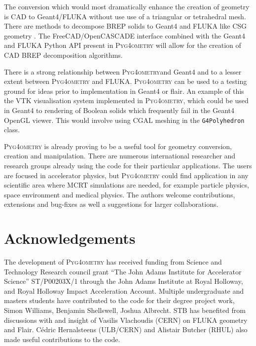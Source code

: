 \documentclass[final,5p,times,twocolumn]{elsarticle}
\newcommand{\pyinline}[1]{\lstinline[postbreak={}]{#1}}
\newcommand{\PYGEOMETRY}{\textsc{Pyg4ometry}}
\begin{document}
The conversion which would most dramatically enhance the creation of geometry is CAD to Geant4/FLUKA
without use use of a triangular or tetrahedral mesh. There are methods to decompose BREP solids to Geant4 and 
FLUKA like CSG geometry \cite{WangNuclSciTech31-82-2020, LuFusionEngineeringAndDesign124-2017}. 
The FreeCAD/OpenCASCADE interface combined with the Geant4 and FLUKA Python API present in \PYGEOMETRY{} 
will allow for the creation of CAD BREP decomposition algorithms.

There is a strong relationship between \PYGEOMETRY and Geant4 and to a lesser extent between 
\PYGEOMETRY{} and FLUKA. \PYGEOMETRY{} can be used to a testing ground for ideas prior to 
implementation in Geant4 or flair. An example of this the VTK visualisation system implemented in 
\PYGEOMETRY{}, which could be used in Geant4 to rendering of Boolean solids which frequently 
fail in the Geant4 OpenGL viewer. This would involve using CGAL meshing in the \pyinline{G4Polyhedron}
class. %

\PYGEOMETRY{} is already proving to be a useful tool for geometry conversion, creation and manipulation.
There are numerous international researcher and research groups already using the code for their particular applications.
The users are focused in accelerator physics, but \PYGEOMETRY{} could find application in any scientific
area where MCRT simulations are needed, for example particle physics, space environment and medical physics.
The authors welcome contributions, extensions and bug-fixes as well a suggestions for larger collaborations.

\section{Acknowledgements}

The development of \PYGEOMETRY{} has received funding from Science and
Technology Research council grant ``The John Adams Institute for
Accelerator Science'' ST/P00203X/1 through the John Adams Institute at
Royal Holloway, and Royal Holloway Impact Acceleration Account.  Multiple
undergraduate and masters students have contributed to the code for their
degree project work, Simon Williams, Benjamin Shellswell, Joshua Albrecht.
STB has benefited from discussions with and insight of Vasilis Vlachoudis
(CERN) on FLUKA geometry and Flair.  Cédric Hernalsteens (ULB/CERN) and
Alistair Butcher (RHUL) also made useful contributions to the code.

\end{document}

